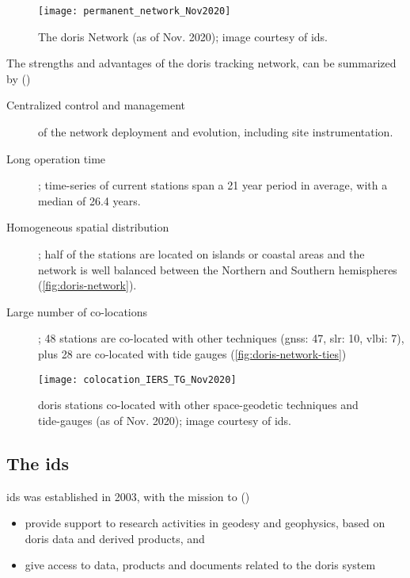 \begin{figure}[h]
  \centering
  \texttt{[image: permanent\_network\_Nov2020]}
  \caption{The \gls{doris} Network (as of Nov. 2020); image courtesy of \gls{ids}.}
  \label{fig:doris-network}
\end{figure}

The strengths and advantages of the \gls{doris} tracking network, can be summarized 
by (\cite{Soudarin2019})
\begin{description}
  \item[Centralized control and management] of the network deployment and evolution, 
    including site instrumentation.
  \item[Long operation time]; time-series of current stations span a 21 year period in average, 
    with a median of 26.4 years.
  \item[Homogeneous spatial distribution]; half of the stations are located on 
    islands or coastal areas and the network is well balanced between the 
    Northern and Southern hemispheres (\autoref{fig:doris-network}).
  \item[Large number of co-locations]; 48 stations are co-located with 
    other techniques (\gls{gnss}: 47, \gls{slr}: 10, \gls{vlbi}: 7), plus 28 are 
    co-located with tide gauges (\autoref{fig:doris-network-ties})
\end{description}

\begin{figure}[h]
  \centering
  \texttt{[image: colocation\_IERS\_TG\_Nov2020]}
  \caption{\gls{doris} stations co-located with other space-geodetic techniques 
    and tide-gauges (as of Nov. 2020); image courtesy of \gls{ids}.}
  \label{fig:doris-network-ties}
\end{figure}

\subsection{The \gls{ids}}\label{ssec:ids}
\gls{ids} was established in 2003, with the mission to (\cite{Soudarin2019})
\begin{itemize}
  \item provide support to research activities in geodesy and geophysics, based 
    on \gls{doris} data and derived products, and
  \item give access to data, products and documents related to the \gls{doris} system
\end{itemize}

